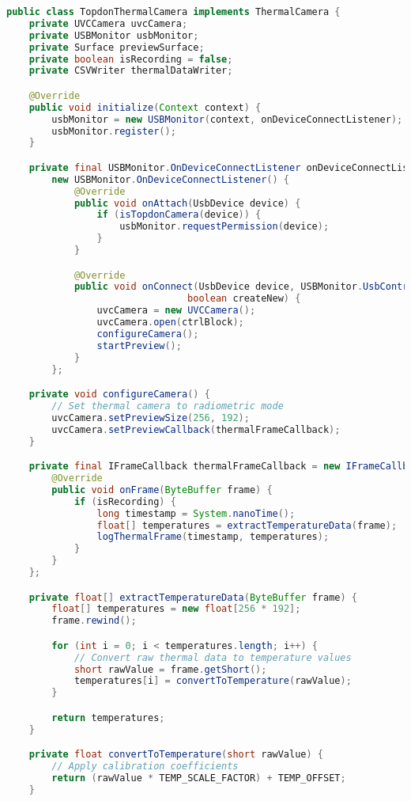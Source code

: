 \begin{lstlisting}[language=Java, caption=Thermal Camera Integration Implementation]
public class TopdonThermalCamera implements ThermalCamera {
    private UVCCamera uvcCamera;
    private USBMonitor usbMonitor;
    private Surface previewSurface;
    private boolean isRecording = false;
    private CSVWriter thermalDataWriter;

    @Override
    public void initialize(Context context) {
        usbMonitor = new USBMonitor(context, onDeviceConnectListener);
        usbMonitor.register();
    }

    private final USBMonitor.OnDeviceConnectListener onDeviceConnectListener =
        new USBMonitor.OnDeviceConnectListener() {
            @Override
            public void onAttach(UsbDevice device) {
                if (isTopdonCamera(device)) {
                    usbMonitor.requestPermission(device);
                }
            }

            @Override
            public void onConnect(UsbDevice device, USBMonitor.UsbControlBlock ctrlBlock,
                                boolean createNew) {
                uvcCamera = new UVCCamera();
                uvcCamera.open(ctrlBlock);
                configureCamera();
                startPreview();
            }
        };

    private void configureCamera() {
        // Set thermal camera to radiometric mode
        uvcCamera.setPreviewSize(256, 192);
        uvcCamera.setPreviewCallback(thermalFrameCallback);
    }

    private final IFrameCallback thermalFrameCallback = new IFrameCallback() {
        @Override
        public void onFrame(ByteBuffer frame) {
            if (isRecording) {
                long timestamp = System.nanoTime();
                float[] temperatures = extractTemperatureData(frame);
                logThermalFrame(timestamp, temperatures);
            }
        }
    };

    private float[] extractTemperatureData(ByteBuffer frame) {
        float[] temperatures = new float[256 * 192];
        frame.rewind();

        for (int i = 0; i < temperatures.length; i++) {
            // Convert raw thermal data to temperature values
            short rawValue = frame.getShort();
            temperatures[i] = convertToTemperature(rawValue);
        }

        return temperatures;
    }

    private float convertToTemperature(short rawValue) {
        // Apply calibration coefficients
        return (rawValue * TEMP_SCALE_FACTOR) + TEMP_OFFSET;
    }


\end{lstlisting}
